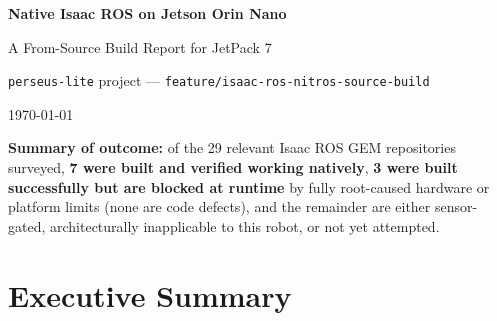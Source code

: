\documentclass[11pt,a4paper]{article}
\begin{document}
\begin{titlepage}
\centering
\vspace*{2.5cm}
{\Huge\bfseries Native Isaac ROS on Jetson Orin Nano\par}
\vspace{0.4cm}
{\Large A From-Source Build Report for JetPack 7\par}
\vspace{1.5cm}
{\large \texttt{perseus-lite} project --- \texttt{feature/isaac-ros-nitros-source-build}\par}
\vspace{0.3cm}
{\large \today\par}
\vspace{2cm}


\vfill

\begin{minipage}{0.85\textwidth}
\centering
\small
\textbf{Summary of outcome:} of the 29 relevant Isaac ROS GEM repositories surveyed,
\textbf{7 were built and verified working natively}, \textbf{3 were built successfully
but are blocked at runtime} by fully root-caused hardware or platform limits
(none are code defects), and the remainder are either sensor-gated, architecturally
inapplicable to this robot, or not yet attempted.
\end{minipage}

\vspace{1cm}
\end{titlepage}

\tableofcontents
\newpage

\section{Executive Summary}
\end{document}
